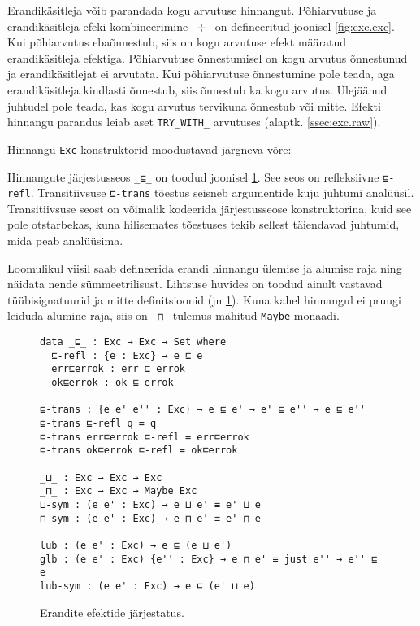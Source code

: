 \documentclass[a4paper,12pt]{article}
\begin{document}
Erandikäsitleja võib parandada kogu arvutuse hinnangut.
Põhiarvutuse ja erandikäsitleja efeki kombineerimine {\tt _⊹_} on defineeritud joonisel \ref{fig:exc.exc}.
Kui põhiarvutus ebaõnnestub, siis on kogu arvutuse efekt määratud erandikäsitleja efektiga.
Põhiarvutuse õnnestumisel on kogu arvutus õnnestunud ja erandikäsitlejat ei arvutata.
Kui põhiarvutuse õnnestumine pole teada, aga erandikäsitleja kindlasti õnnestub, siis õnnestub ka kogu arvutus.
Ülejäänud juhtudel pole teada, kas kogu arvutus tervikuna õnnestub või mitte.
Efekti hinnangu parandus leiab aset {\tt TRY_WITH_} arvutuses (alaptk. \ref{ssec:exc.raw}).

Hinnangu {\tt Exc} konstruktorid moodustavad järgneva võre:
\begin{center}
\end{center}
Hinnangute järjestusseos {\tt _⊑_} on toodud joonisel \ref{fig:exc.ord}.
See seos on refleksiivne {\tt ⊑-refl}.
Transitiivsuse {\tt ⊑-trans} tõestus seisneb argumentide kuju juhtumi analüüsil.
Transitiivsuse seost on võimalik kodeerida järjestusseose konstruktorina, kuid see pole otstarbekas, kuna hilisemates tõestuses tekib sellest täiendavad juhtumid, mida peab analüüsima.

Loomulikul viisil saab defineerida erandi hinnangu ülemise ja alumise raja ning näidata nende sümmeetrilisust.
Lihtsuse huvides on toodud ainult vastavad tüübisignatuurid ja mitte definitsioonid (jn \ref{fig:exc.ord}).
Kuna kahel hinnangul ei pruugi leiduda alumine raja, siis on {\tt _⊓_} tulemus mähitud {\tt Maybe} monaadi.
\begin{figure}
  \begin{verbatim}
data _⊑_ : Exc → Exc → Set where
  ⊑-refl : {e : Exc} → e ⊑ e
  err⊑errok : err ⊑ errok
  ok⊑errok : ok ⊑ errok
  
⊑-trans : {e e' e'' : Exc} → e ⊑ e' → e' ⊑ e'' → e ⊑ e''
⊑-trans ⊑-refl q = q
⊑-trans err⊑errok ⊑-refl = err⊑errok
⊑-trans ok⊑errok ⊑-refl = ok⊑errok

_⊔_ : Exc → Exc → Exc
_⊓_ : Exc → Exc → Maybe Exc
⊔-sym : (e e' : Exc) → e ⊔ e' ≡ e' ⊔ e
⊓-sym : (e e' : Exc) → e ⊓ e' ≡ e' ⊓ e

lub : (e e' : Exc) → e ⊑ (e ⊔ e')
glb : (e e' : Exc) {e'' : Exc} → e ⊓ e' ≡ just e'' → e'' ⊑ e
lub-sym : (e e' : Exc) → e ⊑ (e' ⊔ e)
  \end{verbatim}
  \caption{Erandite efektide järjestatus.}
  \label{fig:exc.ord}
\end{figure}
\end{document}
